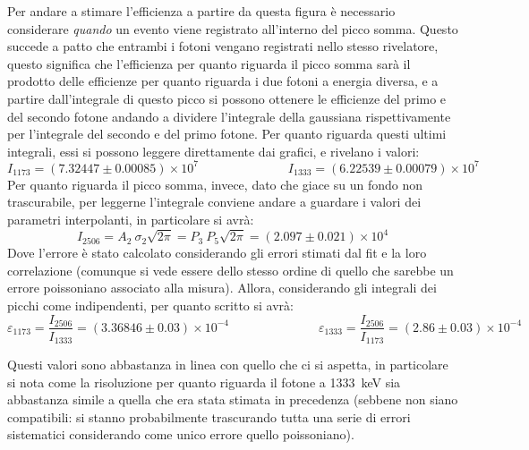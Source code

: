 Per andare a stimare l'efficienza a partire da questa figura è necessario considerare \textit{quando} un evento viene registrato all'interno del picco somma. Questo succede
a patto che entrambi i fotoni vengano registrati nello stesso rivelatore, questo significa che l'efficienza per quanto riguarda il picco somma sarà il prodotto delle efficienze
per quanto riguarda i due fotoni a energia diversa, e a partire dall'integrale di questo picco si possono ottenere le efficienze del primo e del secondo fotone andando a
dividere l'integrale della gaussiana rispettivamente per l'integrale del secondo e del primo fotone. Per quanto riguarda questi ultimi integrali, essi si possono leggere
direttamente dai grafici, e rivelano i valori:
$$I_{1173} = (7.32447 \pm 0.00085)\times 10^7 \hspace{3cm} I_{1333} = (6.22539 \pm 0.00079)\times 10^7$$
Per quanto riguarda il picco somma, invece, dato che giace su un fondo non trascurabile, per leggerne l'integrale conviene andare a guardare i valori dei parametri
interpolanti, in particolare si avrà:
$$I_{2506} = A_2\ \sigma_2\sqrt{2\pi} = P_3\ P_5 \sqrt{2\pi} = (2.097 \pm 0.021)\times 10^4$$
Dove l'errore è stato calcolato considerando gli errori stimati dal fit e la loro correlazione (comunque si vede essere dello stesso ordine di quello che sarebbe un errore
poissoniano associato alla misura). Allora, considerando gli integrali dei picchi come indipendenti, per quanto
scritto si avrà:
$$\varepsilon_{1173}=\frac{I_{2506}}{I_{1333}}=(3.36846 \pm 0.03)\times 10^{-4} \hspace{3cm} \varepsilon_{1333}=\frac{I_{2506}}{I_{1173}}=(2.86 \pm 0.03)\times 10^{-4}$$

Questi valori sono abbastanza in linea con quello che ci si aspetta, in particolare si nota come la risoluzione per quanto riguarda il fotone a 1333~keV sia abbastanza
simile a quella che era stata stimata in precedenza (sebbene non siano compatibili: si stanno probabilmente trascurando tutta una serie di errori sistematici considerando
come unico errore quello poissoniano).
